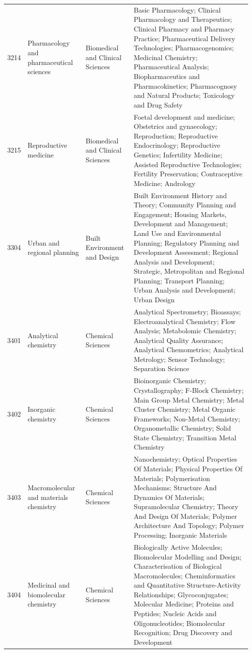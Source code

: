 \begin{longtable}{r p{2.45cm} p{2.55cm} p{6.15cm}}
3214 & Pharmacology and pharmaceutical sciences & Biomedical and Clinical Sciences & Basic Pharmacology; Clinical Pharmacology and Therapeutics; Clinical Pharmacy and Pharmacy Practice; Pharmaceutical Delivery Technologies; Pharmacogenomics; Medicinal Chemistry; Pharmaceutical Analysis; Biopharmaceutics and Pharmacokinetics; Pharmacognosy and Natural Products; Toxicology and Drug Safety \\
3215 & Reproductive medicine & Biomedical and Clinical Sciences & Foetal development and medicine; Obstetrics and gynaecology; Reproduction; Reproductive Endocrinology; Reproductive Genetics; Infertility Medicine; Assisted Reproductive Technologies; Fertility Preservation; Contraceptive Medicine; Andrology \\
3304 & Urban and regional planning & Built Environment and Design & Built Environment History and Theory; Community Planning and Engagement; Housing Markets, Development and Management; Land Use and Environmental Planning; Regulatory Planning and Development Assessment; Regional Analysis and Development; Strategic, Metropolitan and Regional Planning; Transport Planning; Urban Analysis and Development; Urban Design \\
3401 & Analytical chemistry & Chemical Sciences & Analytical Spectrometry; Bioassays; Electroanalytical Chemistry; Flow Analysis; Metabolomic Chemistry; Analytical Quality Assurance; Analytical Chemometrics; Analytical Metrology; Sensor Technology; Separation Science \\
3402 & Inorganic chemistry & Chemical Sciences & Bioinorganic Chemistry; Crystallography; F-Block Chemistry; Main Group Metal Chemistry; Metal Cluster Chemistry; Metal Organic Frameworks; Non-Metal Chemistry; Organometallic Chemistry; Solid State Chemistry; Transition Metal Chemistry \\
3403 & Macromolecular and materials chemistry & Chemical Sciences & Nanochemistry; Optical Properties Of Materials; Physical Properties Of Materials; Polymerisation Mechanisms; Structure And Dynamics Of Materials; Supramolecular Chemistry; Theory And Design Of Materials; Polymer Architecture And Topology; Polymer Processing; Inorganic Materials \\
3404 & Medicinal and biomolecular chemistry & Chemical Sciences & Biologically Active Molecules; Biomolecular Modelling and Design; Characterisation of Biological Macromolecules; Cheminformatics and Quantitative Structure-Activity Relationships; Glycoconjugates; Molecular Medicine; Proteins and Peptides; Nucleic Acids and Oligonucleotides; Biomolecular Recognition; Drug Discovery and Development \\

\end{longtable}
